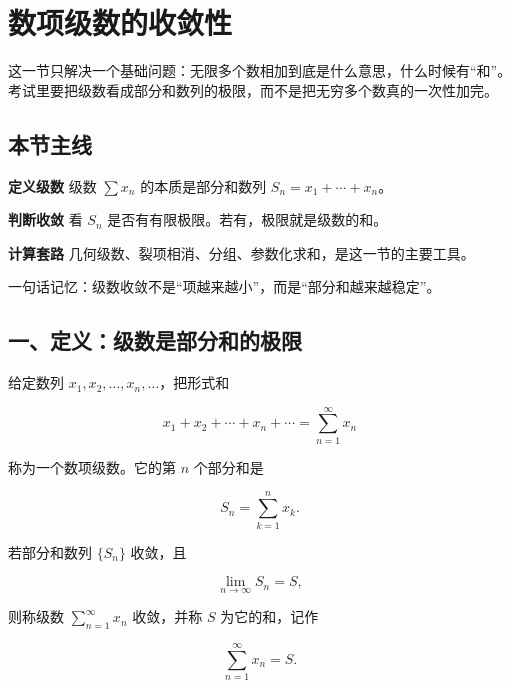 \section{数项级数的收敛性}

这一节只解决一个基础问题：无限多个数相加到底是什么意思，什么时候有“和”。考试里要把级数看成部分和数列的极限，而不是把无穷多个数真的一次性加完。

\subsection*{本节主线}

\begin{conceptbox}
\textbf{定义级数}
级数 \(\sum x_n\) 的本质是部分和数列 \(S_n=x_1+\cdots+x_n\)。
\end{conceptbox}

\begin{conceptbox}
\textbf{判断收敛}
看 \(S_n\) 是否有有限极限。若有，极限就是级数的和。
\end{conceptbox}

\begin{conceptbox}
\textbf{计算套路}
几何级数、裂项相消、分组、参数化求和，是这一节的主要工具。
\end{conceptbox}

\begin{notebox}
一句话记忆：级数收敛不是“项越来越小”，而是“部分和越来越稳定”。
\end{notebox}

\subsection*{一、定义：级数是部分和的极限}

给定数列 \(x_1,x_2,\ldots,x_n,\ldots\)，把形式和

\[
      x_1+x_2+\cdots+x_n+\cdots
      =
      \sum_{n=1}^{\infty}x_n
    \]

称为一个数项级数。它的第 \(n\) 个部分和是

\[
      S_n=\sum_{k=1}^{n}x_k.
    \]

若部分和数列 \(\{S_n\}\) 收敛，且

\[
      \lim_{n\to\infty}S_n=S,
    \]

则称级数 \(\sum_{n=1}^{\infty}x_n\) 收敛，并称 \(S\) 为它的和，记作

\[
      \sum_{n=1}^{\infty}x_n=S.
    \]

